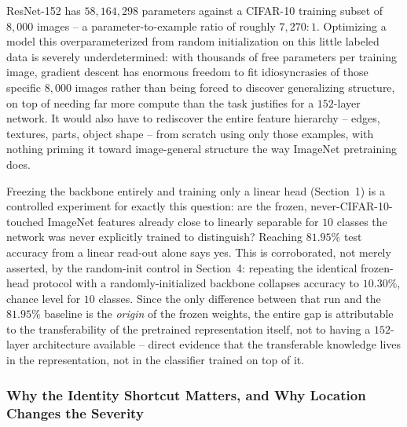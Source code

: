 ResNet-152 has $58{,}164{,}298$ parameters against a CIFAR-10 training
subset of $8{,}000$ images -- a parameter-to-example ratio of roughly
$7{,}270{:}1$. Optimizing a model this overparameterized from random
initialization on this little labeled data is severely underdetermined:
with thousands of free parameters per training image, gradient descent has
enormous freedom to fit idiosyncrasies of those specific $8{,}000$ images
rather than being forced to discover generalizing structure, on top of
needing far more compute than the task justifies for a $152$-layer network.
It would also have to rediscover the entire feature hierarchy -- edges,
textures, parts, object shape -- from scratch using only those examples,
with nothing priming it toward image-general structure the way ImageNet
pretraining does.

Freezing the backbone entirely and training only a linear head
(Section~1) is a controlled experiment for exactly this question: are the
frozen, never-CIFAR-10-touched ImageNet features already close to linearly
separable for $10$ classes the network was never explicitly trained to
distinguish? Reaching $81.95\%$ test accuracy from a linear read-out alone
says yes. This is corroborated, not merely asserted, by the random-init
control in Section~4: repeating the identical frozen-head protocol with a
randomly-initialized backbone collapses accuracy to $10.30\%$, chance
level for $10$ classes. Since the only difference between that run and the
$81.95\%$ baseline is the \emph{origin} of the frozen weights, the entire
gap is attributable to the transferability of the pretrained representation
itself, not to having a $152$-layer architecture available -- direct
evidence that the transferable knowledge lives in the representation, not
in the classifier trained on top of it.

\subsubsection{Why the Identity Shortcut Matters, and Why Location Changes the Severity}

